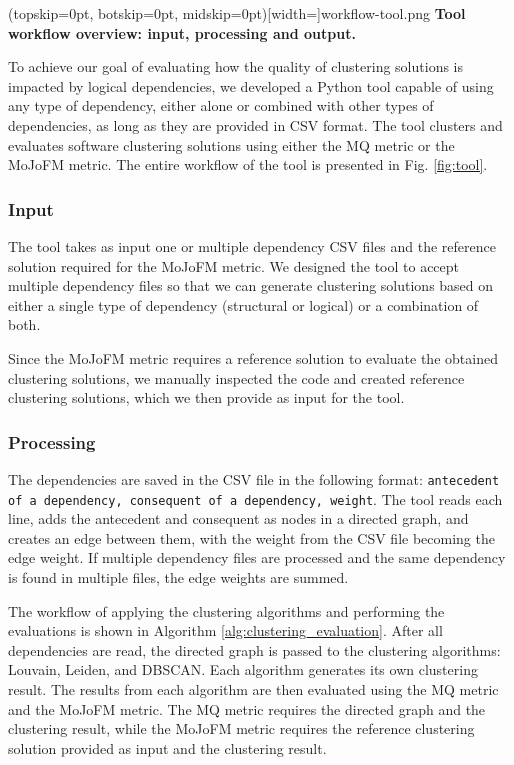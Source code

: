 \documentclass{ieeeaccess}
\begin{document}
\Figure[t!](topskip=0pt, botskip=0pt, midskip=0pt)[width=\textwidth]{workflow-tool.png}
{ \textbf{Tool workflow overview: input, processing and output.}\label{fig:tool}}

To achieve our goal of evaluating how the quality of clustering solutions is impacted by logical dependencies, we developed a Python tool capable of using any type of dependency, either alone or combined with other types of dependencies, as long as they are provided in CSV format. The tool clusters and evaluates software clustering solutions using either the MQ metric or the MoJoFM metric.  The entire workflow of the tool is presented in Fig. \ref{fig:tool}.



\subsubsection{Input}

The tool takes as input one or multiple dependency CSV files and the reference solution required for the MoJoFM metric. We designed the tool to accept multiple dependency files so that we can generate clustering solutions based on either a single type of dependency (structural or logical) or a combination of both.

Since the MoJoFM metric requires a reference solution to evaluate the obtained clustering solutions, we manually inspected the code and created reference clustering solutions, which we then provide as input for the tool.

\subsubsection{Processing}

The dependencies are saved in the CSV file in the following format: \texttt{antecedent of a dependency, consequent of a dependency, weight}. The tool reads each line, adds the antecedent and consequent as nodes in a directed graph, and creates an edge between them, with the weight from the CSV file becoming the edge weight. If multiple dependency files are processed and the same dependency is found in multiple files, the edge weights are summed.

The workflow of applying the clustering algorithms and performing the evaluations is shown in Algorithm \ref{alg:clustering_evaluation}. After all dependencies are read, the directed graph is passed to the clustering algorithms: Louvain, Leiden, and DBSCAN. Each algorithm generates its own clustering result. The results from each algorithm are then evaluated using the MQ metric and the MoJoFM metric. The MQ metric requires the directed graph and the clustering result, while the MoJoFM metric requires the reference clustering solution provided as input and the clustering result. 
\end{document}
